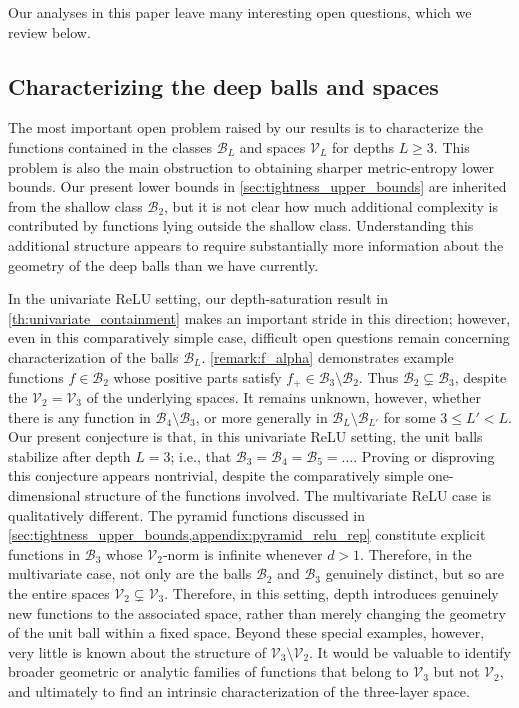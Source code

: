 \documentclass{article}
\def\cB{{\mathcal{B}}}
\def\cV{{\mathcal{V}}}
\begin{document}
Our analyses in this paper leave many interesting open questions, which we review below.

\subsection{Characterizing the deep balls and spaces}

The most important open problem raised by our results is to characterize the functions contained in the classes $\cB_L$ and spaces $\cV_L$ for depths $L\geq 3$. This problem is also the main obstruction to obtaining sharper metric-entropy lower bounds. Our present lower bounds in \cref{sec:tightness_upper_bounds} are inherited from the shallow class $\cB_2$, but it is not clear how much additional complexity is contributed by functions lying outside the shallow class. Understanding this additional structure appears to require substantially more information about the geometry of the deep balls than we have currently.

In the univariate ReLU setting, our depth-saturation result in \cref{th:univariate_containment} makes an important stride in this direction; however, even in this comparatively simple case, difficult open questions remain concerning characterization of the balls $\cB_L$. \cref{remark:f_alpha} demonstrates example functions $f \in \cB_2$ whose positive parts satisfy $f_+ \in \cB_3 \setminus \cB_2$. Thus $\cB_2\subsetneq \cB_3$, despite the $\cV_2=\cV_3$ of the underlying spaces. It remains unknown, however, whether there is any function in $\cB_4 \setminus \cB_3$, or more generally in $\cB_L \setminus \cB_{L'}$ for some $3 \leq L' < L$. Our present conjecture is that, in this univariate ReLU setting, the unit balls stabilize after depth $L=3$; i.e., that $\cB_3 = \cB_4 = \cB_5 = \dots$. Proving or disproving this conjecture appears nontrivial, despite the comparatively simple one-dimensional structure of the functions involved. The multivariate ReLU case is qualitatively different. The pyramid functions discussed in \cref{sec:tightness_upper_bounds,appendix:pyramid_relu_rep} constitute explicit functions in $\cB_3$ whose $\cV_2$-norm is infinite whenever $d>1$. Therefore, in the multivariate case, not only are the balls $\cB_2$ and $\cB_3$ genuinely distinct, but so are the entire spaces $\cV_2 \subsetneq \cV_3$. Therefore, in this setting, depth introduces genuinely new functions to the associated space, rather than merely changing the geometry of the unit ball within a fixed space. Beyond these special examples, however, very little is known about the structure of $\cV_3\setminus \cV_2$. It would be valuable to identify broader geometric or analytic families of functions that belong to $\cV_3$ but not $\cV_2$, and ultimately to find an intrinsic characterization of the three-layer space.
\end{document}

